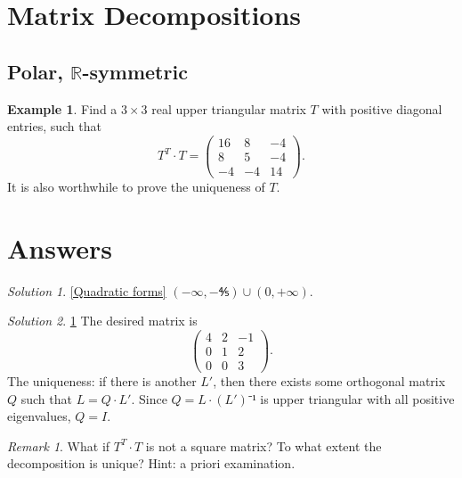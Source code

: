 \documentclass[12pt, reqno]{amsart}
\theoremstyle{plain}
\theoremstyle{definition}
\newtheorem{example}[theorem]{Example}
\theoremstyle{remark}
\newtheorem{remark}[theorem]{Remark}
\numberwithin{equation}{section}
\newtheorem*{solution}{Solution}
\begin{document}
\section{Matrix Decompositions}

\subsection{Polar, \texorpdfstring{$ℝ$}{PDFstring}-symmetric}

\begin{example}\label{Cholesky}
    Find a $3×3$ real upper triangular matrix $T$ with positive diagonal entries, such that
    \begin{equation}
        T^T ⋅ T =
        \begin{pmatrix}
            16 & 8  & -4 \\
            8  & 5  & -4 \\
            -4 & -4 & 14
        \end{pmatrix}.
    \end{equation}
    It is also worthwhile to prove the uniqueness of $T$.
\end{example}






\section{Answers}

\begin{solution}\ref{Quadratic forms}
    $(-∞, -⅘) ∪ (0, +∞)$.
\end{solution}

\begin{solution}\ref{Cholesky}
    The desired matrix is
    \begin{equation}
        \begin{pmatrix}
            4 & 2 & -1 \\0&1&2\\0&0&3
        \end{pmatrix}.
    \end{equation}
    The uniqueness: if there is another $L′$, then there exists some orthogonal matrix $Q$ such that $L = Q ⋅ L′$. Since $Q = L ⋅ (L′)⁻¹$ is upper triangular with all positive eigenvalues, $Q = I$.
    \begin{remark}
        What if $T^T ⋅ T$ is not a square matrix? To what extent the decomposition is unique? Hint: a priori examination.
    \end{remark}
\end{solution}
\end{document}
